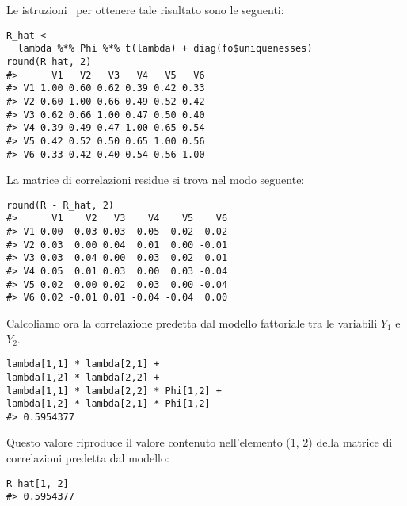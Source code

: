 \begin{exmp}
Le istruzioni \R\, per ottenere tale risultato sono le seguenti:
\begin{lstlisting}
R_hat <- 
  lambda %*% Phi %*% t(lambda) + diag(fo$uniquenesses)
round(R_hat, 2)
#>      V1   V2   V3   V4   V5   V6
#> V1 1.00 0.60 0.62 0.39 0.42 0.33
#> V2 0.60 1.00 0.66 0.49 0.52 0.42
#> V3 0.62 0.66 1.00 0.47 0.50 0.40
#> V4 0.39 0.49 0.47 1.00 0.65 0.54
#> V5 0.42 0.52 0.50 0.65 1.00 0.56
#> V6 0.33 0.42 0.40 0.54 0.56 1.00
\end{lstlisting}
La matrice di correlazioni residue si trova nel modo seguente:
\begin{lstlisting}
round(R - R_hat, 2)
#>      V1    V2   V3    V4    V5    V6
#> V1 0.00  0.03 0.03  0.05  0.02  0.02
#> V2 0.03  0.00 0.04  0.01  0.00 -0.01
#> V3 0.03  0.04 0.00  0.03  0.02  0.01
#> V4 0.05  0.01 0.03  0.00  0.03 -0.04
#> V5 0.02  0.00 0.02  0.03  0.00 -0.04
#> V6 0.02 -0.01 0.01 -0.04 -0.04  0.00
\end{lstlisting}
Calcoliamo ora la correlazione predetta dal modello fattoriale tra le variabili $Y_1$ e $Y_2$.
\begin{lstlisting}
lambda[1,1] * lambda[2,1] +
lambda[1,2] * lambda[2,2] +
lambda[1,1] * lambda[2,2] * Phi[1,2] +
lambda[1,2] * lambda[2,1] * Phi[1,2]
#> 0.5954377 
\end{lstlisting}
Questo valore riproduce il valore contenuto nell'elemento (1, 2) della matrice di correlazioni predetta dal modello:
\begin{lstlisting}
R_hat[1, 2]
#> 0.5954377
\end{lstlisting}


\end{exmp}


